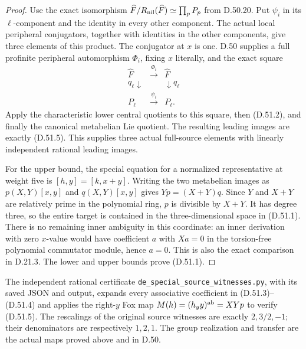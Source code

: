 \begin{proof}
Use the exact isomorphism
\(\widehat F/R_{\rm nil}(\widehat F)\simeq\prod_pP_p\)
from D.50.20. Put \(\psi_i\) in its \(\ell\)-component
and the identity in every other component. The actual
local peripheral conjugators, together with identities
in the other components, give three elements of this
product. The conjugator at \(x\) is one.
D.50 supplies a full profinite peripheral automorphism
\(\Phi_i\), fixing \(x\) literally, and the exact square
\[
 \begin{array}{ccc}
 \widehat F&\xrightarrow{\Phi_i}&\widehat F\\
 q_\ell\downarrow&&\downarrow q_\ell\\
 P_\ell&\xrightarrow{\psi_i}&P_\ell.
 \end{array}
 \tag{D.51.6}
\]
Apply the characteristic lower central quotients to
this square, then \textup{(D.51.2)}, and finally the
canonical metabelian Lie quotient. The resulting
leading images are exactly \textup{(D.51.5)}.
This supplies three actual full-source elements with
linearly independent rational leading images.

For the upper bound, the special equation for a
normalized representative at weight five is
\([h,y]=[k,x+y]\).
Writing the two metabelian images as
\(p(X,Y)[x,y]\) and \(q(X,Y)[x,y]\) gives
\(Yp=(X+Y)q\).
Since \(Y\) and \(X+Y\) are relatively prime in the
polynomial ring, \(p\) is divisible by \(X+Y\).
It has degree three, so the entire target is contained
in the three-dimensional space in \textup{(D.51.1)}.
There is no remaining inner ambiguity in this
coordinate: an inner derivation with zero \(x\)-value
would have coefficient \(a\) with \(Xa=0\) in the
torsion-free polynomial commutator module, hence
\(a=0\). This is also the exact comparison in D.21.3.
The lower and upper bounds prove \textup{(D.51.1)}.
\end{proof}

The independent rational certificate
\texttt{de\_special\_source\_witnesses.py}, with its
saved JSON and output, expands every associative
coefficient in \textup{(D.51.3)--(D.51.4)} and applies
the right-\(y\) Fox map
\(M(h)=(h_y y)^{\rm ab}=XYp\) to verify
\textup{(D.51.5)}. The rescalings of the original
source witnesses are exactly \(2,3/2,-1\); their
denominators are respectively \(1,2,1\).
The group realization and transfer are the actual
maps proved above and in D.50.
